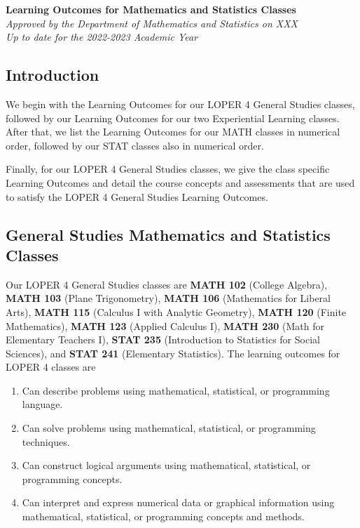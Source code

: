 \documentclass[11pt]{article}
\newenvironment{alphalist}{
\begin{enumerate}[label=(\arabic*),widest=107 ,leftmargin=25pt, itemsep=0pt]}
{\end{enumerate}}
\begin{document}
\begin{flushleft}
    \Large
\textbf{Learning Outcomes for Mathematics and Statistics Classes} \\
\vspace{0.25in}
\normalsize
\emph{Approved by the Department of Mathematics and Statistics on XXX}\\
\emph{Up to date for the 2022-2023 Academic Year}
\end{flushleft}

\subsection{Introduction}

We begin with the Learning Outcomes for our LOPER 4 General Studies  
classes, followed by our Learning Outcomes for our two Experiential Learning
classes. After that, we list the Learning Outcomes for our MATH classes 
in numerical order, followed by our STAT classes also in numerical order.


Finally, for our LOPER 4 General Studies classes, we give the class specific 
Learning Outcomes and detail the course concepts and assessments that are
used to satisfy the LOPER 4 General Studies Learning Outcomes.

\subsection{General Studies Mathematics and Statistics Classes}

Our LOPER 4 General Studies classes are 
\textbf{MATH 102} (College Algebra),
\textbf{MATH 103} (Plane Trigonometry),
\textbf{MATH 106} (Mathematics for Liberal Arts),
\textbf{MATH 115} (Calculus I with Analytic Geometry),
\textbf{MATH 120} (Finite Mathematics),
\textbf{MATH 123} (Applied Calculus I),
\textbf{MATH 230} (Math for Elementary Teachers I),
\textbf{STAT 235} (Introduction to  Statistics for  Social Sciences),
and \textbf{STAT 241}  (Elementary Statistics). The learning outcomes for LOPER  4  classes are

\begin{alphalist}
\item Can describe problems using mathematical, statistical, or programming language.
\item Can solve problems using mathematical, statistical, or programming techniques.
\item Can construct logical arguments using mathematical, statistical, or programming concepts.
\item Can interpret and express numerical data or graphical information using 
   mathematical, statistical, or programming concepts and methods.
\end{alphalist}
\end{document}
